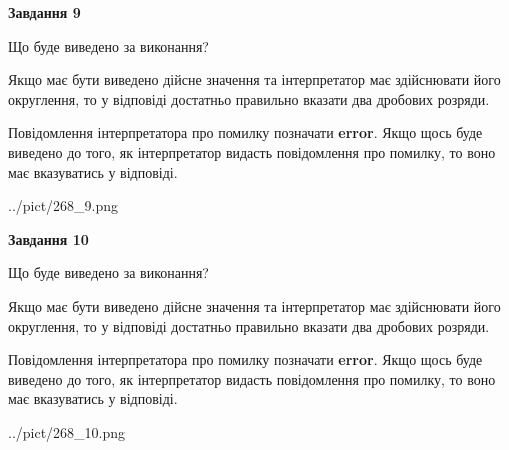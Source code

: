 \documentclass[12pt, ukrainian]{article}
\begin{document}
{\begin {Large}
{\begin {center}\textbf{Завдання 9}\end {center}}\par
Що буде виведено за виконання? \par

Якщо має бути виведено дійсне значення та інтерпретатор має здійснювати його округлення, 
то у відповіді достатньо правильно вказати два дробових розряди.

Повідомлення інтерпретатора про помилку позначати \textbf{error}.
Якщо щось буде виведено до того, як інтерпретатор видасть повідомлення про помилку, 
то воно має вказуватись у відповіді. \par

\begin{center}
	{../pict/268_9.png}
\end{center}
\newpage

{\begin {center}\textbf{Завдання 10}\end {center}}\par
Що буде виведено за виконання? \par

Якщо має бути виведено дійсне значення та інтерпретатор має здійснювати його округлення, 
то у відповіді достатньо правильно вказати два дробових розряди.

Повідомлення інтерпретатора про помилку позначати \textbf{error}.
Якщо щось буде виведено до того, як інтерпретатор видасть повідомлення про помилку, 
то воно має вказуватись у відповіді. \par

\begin{center}
	{../pict/268_10.png}
\end{center}
\newpage

\end {Large}}
\end{document}
